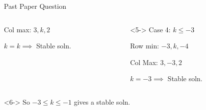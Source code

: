 \documentclass[8pt]{beamer}
\begin{document}
\begin{frame}[shrink=13]{Past Paper Question}
\begin{columns}[T]
\begin{column}{.5\linewidth}
\begin{solution}
Col max: $3,k,2$

 $k=k\implies$ Stable soln.
 \end{solution}
 \end{column}
 \begin{column}{.5\textwidth}
 \begin{solution}<5->
 Case 4: $k\leq -3$

 Row min: $-3,k,-4$

 Col Max: $3,-3,2$

  $k=-3\implies$ Stable soln.
  \end{solution}
		\end{column}
		\end{columns}
		\begin{solution}<6->
		So $-3\leq k\leq -1$ gives a stable soln.
	\end{solution}
\end{frame}
\end{document}
